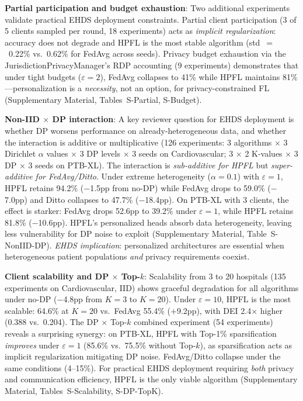 \documentclass[conference,a4paper]{IEEEtran}
\begin{document}
\textbf{Partial participation and budget exhaustion}: Two additional experiments validate practical EHDS deployment constraints. Partial client participation (3 of 5 clients sampled per round, 18 experiments) acts as \textit{implicit regularization}: accuracy does not degrade and HPFL is the most stable algorithm (std~$=$~0.22\% vs.\ 0.62\% for FedAvg across seeds). Privacy budget exhaustion via the JurisdictionPrivacyManager's RDP accounting (9 experiments) demonstrates that under tight budgets ($\varepsilon{=}2$), FedAvg collapses to 41\% while HPFL maintains 81\%---personalization is a \textit{necessity}, not an option, for privacy-constrained FL (Supplementary Material, Tables~S-Partial, S-Budget).

\textbf{Non-IID $\times$ DP interaction}: A key reviewer question for EHDS deployment is whether DP worsens performance on already-heterogeneous data, and whether the interaction is additive or multiplicative (126 experiments: 3 algorithms $\times$ 3 Dirichlet $\alpha$ values $\times$ 3 DP levels $\times$ 3 seeds on Cardiovascular; 3 $\times$ 2 K-values $\times$ 3 DP $\times$ 3 seeds on PTB-XL). The interaction is \textit{sub-additive for HPFL} but \textit{super-additive for FedAvg/Ditto}. Under extreme heterogeneity ($\alpha{=}0.1$) with $\varepsilon{=}1$, HPFL retains 94.2\% ($-$1.5pp from no-DP) while FedAvg drops to 59.0\% ($-$7.0pp) and Ditto collapses to 47.7\% ($-$18.4pp). On PTB-XL with 3 clients, the effect is starker: FedAvg drops 52.6pp to 39.2\% under $\varepsilon{=}1$, while HPFL retains 81.8\% ($-$10.6pp). HPFL's personalized heads absorb data heterogeneity, leaving less vulnerability for DP noise to exploit (Supplementary Material, Table~S-NonIID-DP). \textit{EHDS implication}: personalized architectures are essential when heterogeneous patient populations \textit{and} privacy requirements coexist.

\textbf{Client scalability and DP $\times$ Top-$k$}: Scalability from 3 to 20 hospitals (135 experiments on Cardiovascular, IID) shows graceful degradation for all algorithms under no-DP ($-$4.8pp from $K{=}3$ to $K{=}20$). Under $\varepsilon{=}10$, HPFL is the most scalable: 64.6\% at $K{=}20$ vs.\ FedAvg 55.4\% ($+$9.2pp), with DEI 2.4$\times$ higher (0.388 vs.\ 0.204). The DP $\times$ Top-$k$ combined experiment (54 experiments) reveals a surprising synergy: on PTB-XL, HPFL with Top-1\% sparsification \textit{improves} under $\varepsilon{=}1$ (85.6\% vs.\ 75.5\% without Top-$k$), as sparsification acts as implicit regularization mitigating DP noise. FedAvg/Ditto collapse under the same conditions (4--15\%). For practical EHDS deployment requiring \textit{both} privacy and communication efficiency, HPFL is the only viable algorithm (Supplementary Material, Tables~S-Scalability, S-DP-TopK).
\end{document}
